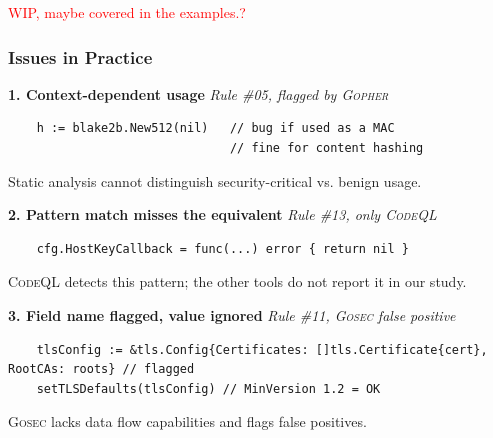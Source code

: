 \documentclass[10pt]{beamer}
\newcommand{\CodeQL}{\textsc{CodeQL}\xspace}
\newcommand{\Gopher}{\textsc{Gopher}\xspace}
\newcommand{\Gosec}{\textsc{Gosec}\xspace}
\newcommand{\SnykCode}{\textsc{Snyk Code}\xspace}
\begin{document}


\begin{frame}[fragile]
    \textcolor{red}{WIP, maybe covered in the examples.?}
    \frametitle{Issues in Practice}
    \footnotesize
    \vspace{-0.3em}

    \textbf{1. Context-dependent usage} \hfill \textit{Rule \#05, flagged by \Gopher}
    \begin{verbatim}
    h := blake2b.New512(nil)   // bug if used as a MAC
                               // fine for content hashing
    \end{verbatim}
    Static analysis cannot distinguish security-critical vs. benign usage.
    \vspace{0.4em}

    \textbf{2. Pattern match misses the equivalent} \hfill \textit{Rule \#13, only \CodeQL}
    \begin{verbatim}
    cfg.HostKeyCallback = func(...) error { return nil }
    \end{verbatim}
    \CodeQL detects this pattern; the other tools do not report it in our study.
    \vspace{0.4em}

    \textbf{3. Field name flagged, value ignored} \hfill \textit{Rule \#11, \Gosec false positive}
    \begin{verbatim}
    tlsConfig := &tls.Config{Certificates: []tls.Certificate{cert}, RootCAs: roots} // flagged
	setTLSDefaults(tlsConfig) // MinVersion 1.2 = OK
    \end{verbatim}
    \Gosec lacks data flow capabilities and flags false positives.
\end{frame}
\end{document}
